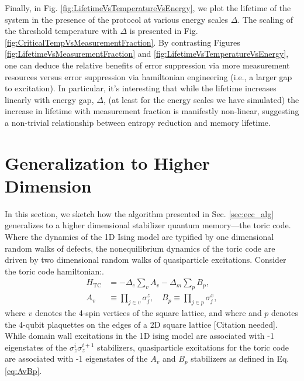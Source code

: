 \documentclass[twocolumn,superscriptaddress,aps,prb,floatfix]{revtex4-1}
\newcommand{\Htc}{H_{\mathrm{TC}}}
\newcommand{\figref}[1]{Fig. \ref{#1}}
\newcommand{\needcite}{{\color{blue} {[Citation needed]}}}
\newcommand{\CMH}[1]{{\color{green} { #1}}}
\newcommand{\MS}[1]{{\color{mauve} {#1}}}
\begin{document}
Finally, in Fig. \ref{fig:LifetimeVsTemperatureVsEnergy}, we plot the lifetime of the system in the presence of the protocol at various energy scales $\Delta$. \CMH{The scaling of the threshold temperature with $\Delta$ is presented in  \figref{fig:CriticalTempVsMeasurementFraction}}. By contrasting Figures \ref{fig:LifetimeVsMeasurementFraction} and \ref{fig:LifetimeVsTemperatureVsEnergy}, one can deduce the relative benefits of error suppression via more measurement resources versus error suppression via hamiltonian engineering (i.e., a larger gap to excitation). \MS{In particular, it's interesting that while the lifetime increases linearly with energy gap, $\Delta$, (at least for the energy scales we have simulated) the increase in lifetime with measurement fraction is manifestly non-linear, suggesting a non-trivial relationship between entropy reduction and memory lifetime. }


\section{Generalization to Higher Dimension}
\label{sec:tc_alg}

 In this section, we sketch how the algorithm presented in Sec. \ref{sec:ecc_alg} generalizes to a higher dimensional stabilizer quantum memory---the toric code.  Where the dynamics of the 1D Ising model are typified by one dimensional random walks of defects, the nonequilibrium dynamics of the toric code are driven by two dimensional random walks of quasiparticle excitations.  Consider the toric code hamiltonian:.
 \begin{align}
\Htc &= -\Delta_e \sum_v A_v -\Delta_m \sum_p B_p ,\label{eq:HTC}\\
A_v &\equiv \prod_{j \in v} \sigma_j^z,\quad B_p \equiv \prod_{j \in p} \sigma_j^x,\label{eq:AvBp}
\end{align}
\noindent
where $v$ denotes the 4-spin vertices of the square lattice, and where and $p$ denotes the 4-qubit plaquettes on the edges of a 2D square lattice\needcite.
While domain wall excitations in the 1D ising model are associated with -1 eigenstates of the $\sigma_z^i \sigma_z^{i+1}$ stabilizers, quasiparticle excitations for the toric code are associated with -1 eigenstates of the $A_v$ and $B_p$ stabilizers as defined in Eq. \ref{eq:AvBp}.
 
\end{document}
